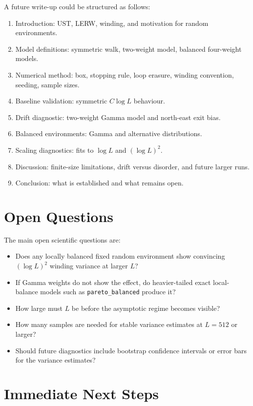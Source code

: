 \documentclass[11pt]{article}
\begin{document}
A future write-up could be structured as follows:
\begin{enumerate}
  \item Introduction: UST, LERW, winding, and motivation for random
        environments.
  \item Model definitions: symmetric walk, two-weight model, balanced
        four-weight models.
  \item Numerical method: box, stopping rule, loop erasure, winding convention,
        seeding, sample sizes.
  \item Baseline validation: symmetric $C\log L$ behaviour.
  \item Drift diagnostic: two-weight Gamma model and north-east exit bias.
  \item Balanced environments: Gamma and alternative distributions.
  \item Scaling diagnostics: fits to $\log L$ and $(\log L)^2$.
  \item Discussion: finite-size limitations, drift versus disorder, and future
        larger runs.
  \item Conclusion: what is established and what remains open.
\end{enumerate}

\section{Open Questions}

The main open scientific questions are:
\begin{itemize}
  \item Does any locally balanced fixed random environment show convincing
        $(\log L)^2$ winding variance at larger $L$?
  \item If Gamma weights do not show the effect, do heavier-tailed exact
        local-balance models such as \texttt{pareto\_balanced} produce it?
  \item How large must $L$ be before the asymptotic regime becomes visible?
  \item How many samples are needed for stable variance estimates at $L=512$
        or larger?
  \item Should future diagnostics include bootstrap confidence intervals or
        error bars for the variance estimates?
\end{itemize}

\section{Immediate Next Steps}
\end{document}
